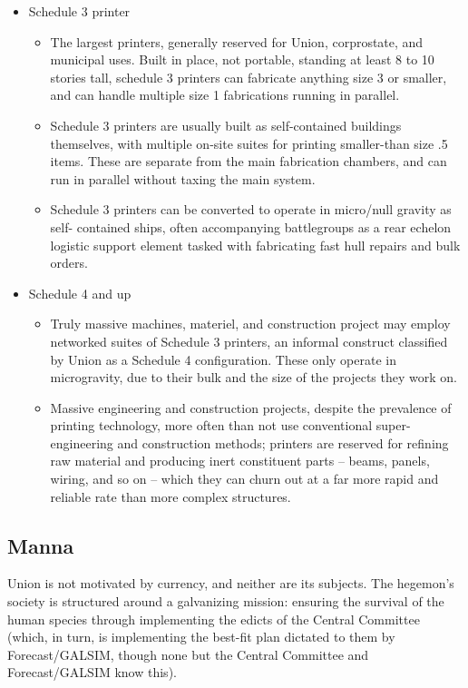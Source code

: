 \begin{itemize}
\begin{itemize}
\end{itemize}
\item Schedule 3 printer
\begin{itemize}
\item The largest printers, generally reserved for Union, corprostate, and municipal
      uses. Built in place, not portable, standing at least 8 to 10 stories tall, schedule 3
      printers can fabricate anything size 3 or smaller, and can handle multiple size 1
      fabrications running in parallel.
\item Schedule 3 printers are usually built as self-contained buildings themselves, with
      multiple on-site suites for printing smaller-than size .5 items. These are separate
      from the main fabrication chambers, and can run in parallel without taxing the
      main system.
\item Schedule 3 printers can be converted to operate in micro/null gravity as self-
      contained ships, often accompanying battlegroups as a rear echelon logistic
      support element tasked with fabricating fast hull repairs and bulk orders.
\end{itemize}
\item Schedule 4 and up
\begin{itemize}
\item Truly massive machines, materiel, and construction project may employ
      networked suites of Schedule 3 printers, an informal construct classified by Union
      as a Schedule 4 configuration. These only operate in microgravity, due to their
      bulk and the size of the projects they work on.
\item Massive engineering and construction projects, despite the prevalence of printing
      technology, more often than not use conventional super-engineering and
      construction methods; printers are reserved for refining raw material and
      producing inert constituent parts -- beams, panels, wiring, and so on -- which they
      can churn out at a far more rapid and reliable rate than more complex structures.
\end{itemize}
\end{itemize}

\subsection{Manna}

Union is not motivated by currency, and neither are its subjects. The hegemon's society is
structured around a galvanizing mission: ensuring the survival of the human species through
implementing the edicts of the Central Committee (which, in turn, is implementing the best-fit
plan dictated to them by Forecast/GALSIM, though none but the Central Committee and
Forecast/GALSIM know this).

